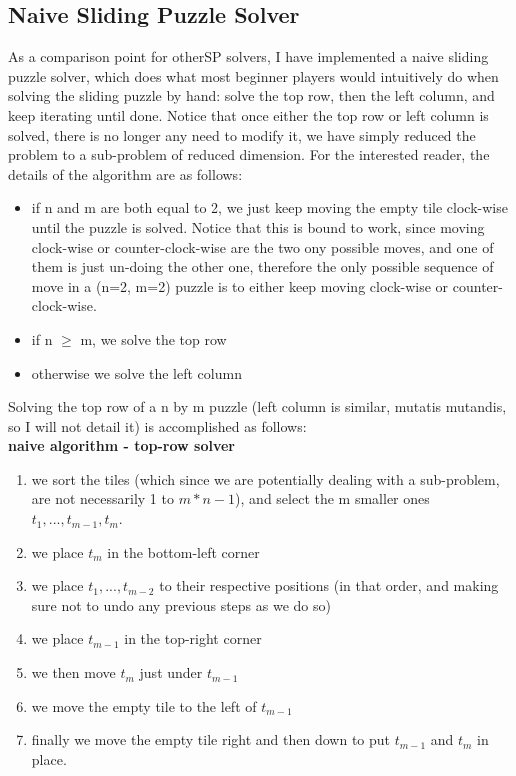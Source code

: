 \subsection{Naive Sliding Puzzle Solver}
As a comparison point for otherSP solvers, I have implemented a naive sliding puzzle solver, which does what most beginner players would intuitively do when solving the sliding puzzle by hand: solve the top row, then the left column, and keep iterating until done. Notice that once either the top row or left column is solved, there is no longer any need to modify it, we have simply reduced the problem to a sub-problem of reduced dimension. For the interested reader, the details of the algorithm are as follows:
\begin{itemize}
\item if n and m are both equal to 2, we just keep moving the empty tile clock-wise until the puzzle is solved. Notice that this is bound to work, since moving clock-wise or counter-clock-wise are the two ony possible moves, and one of them is just un-doing the other one, therefore the only possible sequence of move in a (n=2, m=2) puzzle is to either keep moving clock-wise or counter-clock-wise.
\item if n $\geq$ m, we solve the top row
\item otherwise we solve the left column
\end{itemize}
Solving the top row of a n by m puzzle (left column is similar, mutatis mutandis, so I will not detail it) is accomplished as follows:
\\
\textbf{naive algorithm - top-row solver}
\begin{enumerate}
\item \label{s1} we sort the tiles (which since we are potentially dealing with a sub-problem, are not necessarily 1 to $m* n - 1$), and select the m smaller ones $t_{1}, ..., t_{m-1}, t_{m}$.
\item \label{s2} we place $t_{m}$ in the bottom-left corner
\item \label{s3} we place $t_{1}, ..., t_{m-2}$ to their respective positions (in that order, and making sure not to undo any previous steps as we do so)
\item \label{s4} we place $t_{m-1}$ in the top-right corner
\item \label{s5} we then move $t_{m}$ just under $t_{m-1}$
\item \label{s6} we move the empty tile to the left of $t_{m-1}$
\item \label{s7} finally we move the empty tile right and then down to put $t_{m-1}$ and $t_{m}$ in place.
\end{enumerate}
